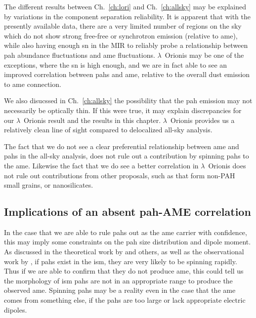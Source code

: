                The different results between Ch.~\ref{ch:lori} and Ch.~\ref{ch:allsky} may be explained by variations in the component separation reliability. It is apparent that with the presently available data, there are a very limited number of regions on the sky which do not show strong free-free or synchrotron emission (relative to \acrshort{ame}), while also having enough \acrshort{sn} in the MIR to reliably probe a relationship between \acrshort{pah} abundance fluctuations and \acrshort{ame} fluctuations. $\lambda$~Orionis may be one of the exceptions, where the \acrshort{sn} is high enough, and we are in fact able to see an improved correlation between \acrshort{pah}s and \acrshort{ame}, relative to the overall dust emission to \acrshort{ame} connection.

              We also disucssed in Ch.~\ref{ch:allsky} the possibility that the \acrshort{pah} emission may not necessarily be optically thin. If this were true, it may explain discrepancies for our $\lambda$~Orionis result and the results in this chapter. $\lambda$~Orionis provides us a relatively clean line of sight compared to delocalized all-sky analysis.

              The fact that we do not see a clear preferential relationship between \acrshort{ame} and \acrshort{pah}s in the all-sky analysis, does not rule out a contribution by spinning \acrshort{pah}s to the \acrshort{ame}. Likewise the fact that we do see a better correlation in $\lambda$~Orionis does not rule out contributions from other proposals, such as that form non-PAH small grains, or nanosilicates.


              \subsection{Implications of an absent \acrshort{pah}-AME correlation}
                  In the case that we are able to rule \acrshort{pah}s out as the \acrshort{ame} carrier with confidence, this may imply some constraints on the \acrshort{pah} size distribution and dipole moment. As discussed in the theoretical work by \cite{draine98a, ali-haimoud10} and others, as well as the observational work by \cite{hensley16}, if \acrshort{pah}s exist in the \acrshort{ism}, they are very likely to be spinning rapidly. Thus if we are able to confirm that they do not produce \acrshort{ame}, this could tell us the morphology of \acrshort{ism} \acrshort{pah}s are not in an appropriate range to produce the observed \acrshort{ame}. Spinning \acrshort{pah}s may be a reality even in the case that the \acrshort{ame} comes from something else, if the \acrshort{pah}s are too large or lack appropriate electric dipoles.

